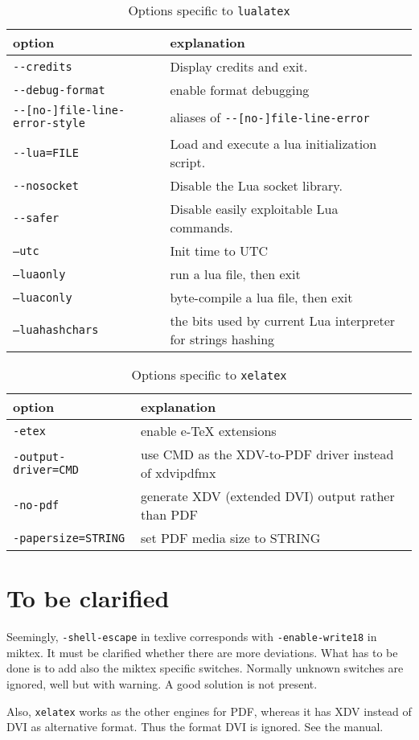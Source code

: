 \documentclass{article}
\newcommand{\lualatex}{\texttt{lualatex}}
\newcommand{\xelatex}{\texttt{xelatex}}
\begin{document}
{\small
\begin{longtable}{|ll|}
\toprule
option & explanation \\
\midrule
\midrule
\endfirsthead%
\bottomrule
\caption{\label{tab:latexOptionsLualatex} Options specific to \lualatex{} }
\endlastfoot%
\texttt{-{}-credits}                    & Display credits and exit. \\
\texttt{-{}-debug-format}               & enable format debugging \\
\texttt{-{}-[no-]file-line-error-style} & aliases of \texttt{-{}-[no-]file-line-error} \\
\texttt{-{}-lua=FILE}                   & Load and execute a lua initialization script. \\
\texttt{-{}-nosocket}                   & Disable the Lua socket library. \\
\texttt{-{}-safer}                      & Disable easily exploitable Lua commands. \\
\texttt{--utc}                          & Init time to UTC \\
\midrule
\texttt{--luaonly}                      & run a lua file, then exit \\
\texttt{--luaconly}                     & byte-compile a lua file, then exit \\
\texttt{--luahashchars}                 & the bits used by current Lua interpreter for strings hashing \\
\end{longtable}
}


{\small
\begin{longtable}{|ll|}
\toprule
option & explanation \\
\midrule
\midrule
\endfirsthead%
\bottomrule
\caption{\label{tab:latexOptionsXelatex} Options specific to \xelatex{} }
\endlastfoot%
\texttt{-etex}                   & enable e-TeX extensions \\
\texttt{-output-driver=CMD}      & use CMD as the XDV-to-PDF driver instead of xdvipdfmx \\
\texttt{-no-pdf}                 & generate XDV (extended DVI) output rather than PDF \\
\texttt{-papersize=STRING}       & set PDF media size to STRING \\
\end{longtable}
}

\section{To be clarified}

Seemingly, \texttt{-shell-escape} in texlive corresponds with \texttt{-enable-write18} in miktex. 
It must be clarified whether there are more deviations. 
What has to be done is to add also the miktex specific switches. 
Normally unknown switches are ignored, well but with warning. 
A good solution is not present. 

Also, \xelatex{} works as the other engines for PDF, 
whereas it has XDV instead of DVI as alternative format. 
Thus the format DVI is ignored. 
See the manual. 






{}%
\end{document}
